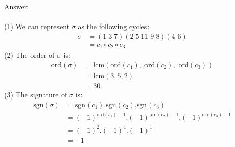 \documentclass[12pt,a4paper]{article}
\begin{document}
\vspace{1cm}
\noindent
Answer:\\
\\
(1) We can represent $\sigma$ as the following cycles:
\begin{align*}
    \sigma &= (1 \; 3 \; 7)(2 \; 5 \; 11 \; 9 \; 8)(4 \; 6) \\
        &= c_1 \circ c_2 \circ c_3
\end{align*}
(2) The order of $\sigma$ is:
\begin{align*}
 \text{ord}(\sigma) &= \text{lcm}(\text{ord}(c_1),\; \text{ord}(c_2),\; \text{ord}(c_3)) \\
   &= \text{lcm}(3, 5, 2) \\
   &= 30
\end{align*}
(3) The signature of $\sigma$ is:
\begin{align*}
 \text{sgn}(\sigma) &= \text{sgn}(c_1) . \text{sgn}(c_2) . \text{sgn}(c_3)\\
  &= (-1)^{\text{ord}(c_1)-1} . (-1)^{\text{ord}(c_2)-1} . (-1)^{\text{ord}(c_3)-1} \\
  &= (-1)^2 . (-1)^4 . (-1)^1 \\
  &= -1
\end{align*}
\end{document}
